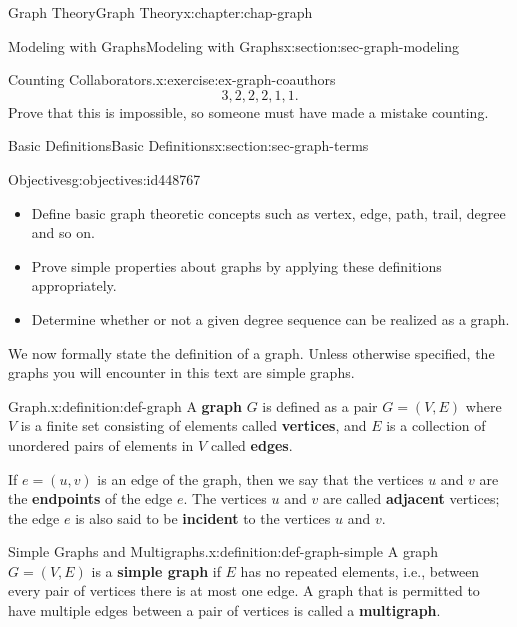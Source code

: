 \documentclass[oneside,10pt,]{book}
\newcommand{\terminology}[1]{\textbf{#1}}
\numberwithin{equation}{section}
\begin{document}
\begin{chapterptx}{Graph Theory}{}{Graph Theory}{}{}{x:chapter:chap-graph}
\begin{sectionptx}{Modeling with Graphs}{}{Modeling with Graphs}{}{}{x:section:sec-graph-modeling}
\begin{inlineexercise}{Counting Collaborators.}{x:exercise:ex-graph-coauthors}
\begin{equation*}
3,2,2,2,1,1\text{.}
\end{equation*}
Prove that this is impossible, so someone must have made a mistake counting.%
\end{inlineexercise}
\end{sectionptx}
%
%
\typeout{************************************************}
\typeout{************************************************}
%
\begin{sectionptx}{Basic Definitions}{}{Basic Definitions}{}{}{x:section:sec-graph-terms}
\begin{objectives}{Objectives}{g:objectives:id448767}
%
\begin{itemize}[label=\textbullet]
\item{}Define basic graph theoretic concepts such as vertex, edge, path, trail, degree and so on.%
\item{}Prove simple properties about graphs by applying these definitions appropriately.%
\item{}Determine whether or not a given degree sequence can be realized as a graph.%
\end{itemize}
\end{objectives}
We now formally state the definition of a graph. Unless otherwise specified, the graphs you will encounter in this text are simple graphs.%
\begin{definition}{Graph.}{x:definition:def-graph}%
A \terminology{graph} \(G\) is defined as a pair \(G = (V,E)\) where \(V\) is a finite set consisting of elements called \terminology{vertices}, and \(E\) is a collection of unordered pairs of elements in \(V\) called \terminology{edges}.%
\par
If \(e = (u,v)\) is an edge of the graph, then we say that the vertices \(u\) and \(v\) are the \terminology{endpoints} of the edge \(e\). The vertices \(u\) and \(v\) are called \terminology{adjacent} vertices; the edge \(e\) is also said to be \terminology{incident} to the vertices \(u\) and \(v\).%
\end{definition}
\begin{definition}{Simple Graphs and Multigraphs.}{x:definition:def-graph-simple}%
A graph \(G = (V,E)\) is a \terminology{simple graph} if \(E\) has no repeated elements, i.e.\@, between every pair of vertices there is at most one edge. A graph that is permitted to have multiple edges between a pair of vertices is called a \terminology{multigraph}.%
\end{definition}

\end{sectionptx}
\end{chapterptx}
\end{document}
